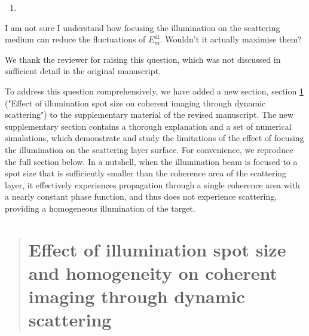 \documentclass[12pt]{article}
\newenvironment{solved_reviewercomment}
    {\begin{tcolorbox}[width=\linewidth,colback=gray!5,colframe=solved_commentcolor!50,title=Reviewer Comment,left=5pt,right=5pt]}
    {\end{tcolorbox}}
\newenvironment{finished_ourresponse}
    {\begin{tcolorbox}[width=\linewidth,breakable,enhanced,colback=gray!5,colframe=finished_responsecolor!50,title=Response,left=5pt,right=5pt]}
    {\end{tcolorbox}}
\begin{document}
        
\begin{enumerate}[label=\arabic*., resume]
\item \leavevmode
\end{enumerate}
\vspace{-1em}
\begin{solved_reviewercomment}
    I am not sure I understand how focusing the illumination on the scattering medium can reduce the fluctuations of \(E^{\text{ill}}_m\). Wouldn't it actually maximise them?    
\end{solved_reviewercomment}

\begin{finished_ourresponse}
We thank the reviewer for raising this question, which was not discussed in sufficient detail in the original manuscript.

To address this question comprehensively, we have added a new section, section \ref{sec: effect of spot size} ("Effect of illumination spot size on coherent imaging through dynamic scattering") to the supplementary material of the revised manuscript. The new supplementary section contains a thorough explanation and a set of numerical simulations, which demonstrate and study the limitations of the effect of focusing the illumination on the scattering layer surface. For convenience, we reproduce the full section below. In a nutshell, when the illumination beam is focused to a spot size that is sufficiently smaller than the coherence area of the scattering layer, it effectively experiences propagation through a single coherence area with a nearly constant phase function, and thus does not experience scattering, providing a homogeneous illumination of the target.
\begin{quote}
    \setcounter{section}{224}
    \section{Effect of illumination spot size and homogeneity on coherent imaging through dynamic scattering}
    \label{sec: effect of spot size}



\end{quote}
\end{finished_ourresponse}
\end{document}
